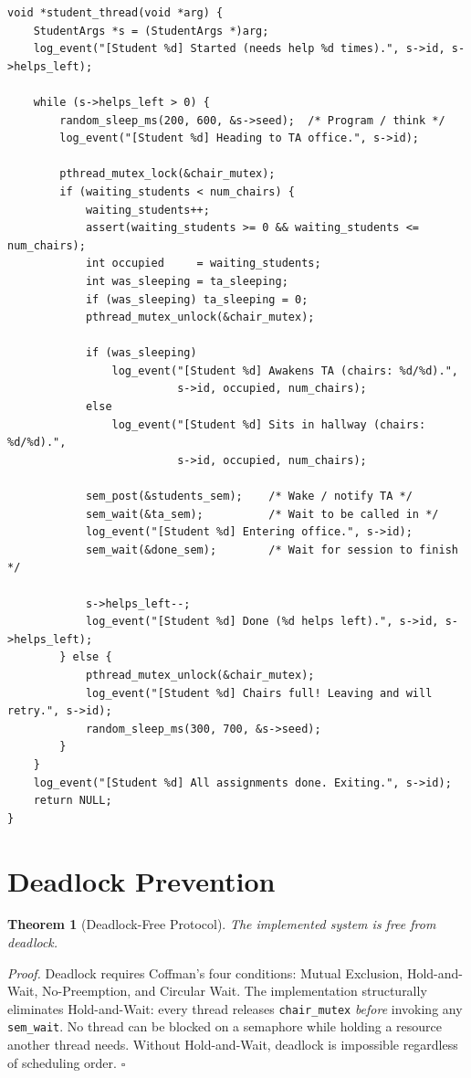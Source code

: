 \documentclass[12pt,a4paper]{report}
\newtheorem{theorem}{Theorem}[chapter]
\begin{document}
\begin{lstlisting}[caption={Student thread -- src/student.c (complete).}, label={lst:student}]
void *student_thread(void *arg) {
    StudentArgs *s = (StudentArgs *)arg;
    log_event("[Student %d] Started (needs help %d times).", s->id, s->helps_left);

    while (s->helps_left > 0) {
        random_sleep_ms(200, 600, &s->seed);  /* Program / think */
        log_event("[Student %d] Heading to TA office.", s->id);

        pthread_mutex_lock(&chair_mutex);
        if (waiting_students < num_chairs) {
            waiting_students++;
            assert(waiting_students >= 0 && waiting_students <= num_chairs);
            int occupied     = waiting_students;
            int was_sleeping = ta_sleeping;
            if (was_sleeping) ta_sleeping = 0;
            pthread_mutex_unlock(&chair_mutex);

            if (was_sleeping)
                log_event("[Student %d] Awakens TA (chairs: %d/%d).",
                          s->id, occupied, num_chairs);
            else
                log_event("[Student %d] Sits in hallway (chairs: %d/%d).",
                          s->id, occupied, num_chairs);

            sem_post(&students_sem);    /* Wake / notify TA */
            sem_wait(&ta_sem);          /* Wait to be called in */
            log_event("[Student %d] Entering office.", s->id);
            sem_wait(&done_sem);        /* Wait for session to finish */

            s->helps_left--;
            log_event("[Student %d] Done (%d helps left).", s->id, s->helps_left);
        } else {
            pthread_mutex_unlock(&chair_mutex);
            log_event("[Student %d] Chairs full! Leaving and will retry.", s->id);
            random_sleep_ms(300, 700, &s->seed);
        }
    }
    log_event("[Student %d] All assignments done. Exiting.", s->id);
    return NULL;
}
\end{lstlisting}

\section{Deadlock Prevention}

\begin{theorem}[Deadlock-Free Protocol]
The implemented system is free from deadlock.
\end{theorem}

\noindent\textit{Proof.} Deadlock requires Coffman's four conditions: Mutual Exclusion,
Hold-and-Wait, No-Preemption, and Circular Wait. The implementation structurally eliminates
Hold-and-Wait: every thread releases \texttt{chair\_mutex} \emph{before} invoking any
\texttt{sem\_wait}. No thread can be blocked on a semaphore while holding a resource another
thread needs. Without Hold-and-Wait, deadlock is impossible regardless of scheduling order.
\hfill$\square$
\end{document}

